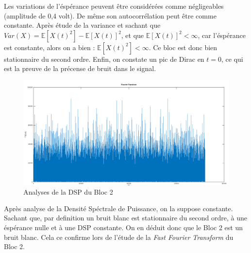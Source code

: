 \documentclass[french, a4paper, 12pt, openany]{book}
\begin{document}
	Les variations de l'éspérance peuvent être considérées comme négligeables (amplitude de 0,4 volt). De même son autocorrélation peut être comme constante.
	Après étude de la variance et sachant que \begin{math}Var(X) = \mathbb{E}[X(t)^2] - \mathbb{E}[X(t)]^2\end{math}, et que \begin{math}\mathbb{E}[X(t)]^2<\infty\end{math}, car l'éspérance est constante, alors on a bien : \begin{math}\mathbb{E}[X(t)^2]<\infty\end{math}. Ce bloc est donc bien stationnaire du second ordre.
	Enfin, on constate un pic de Dirac en \(t = 0\), ce qui est la preuve de la précense de bruit dans le signal.

	\begin{figure}[ht]
		\begin{center}
		\includegraphics[scale=0.25]{images/DSPBloc2.png}
		\end{center}
		\caption{Analyses de la DSP du Bloc 2}
		\label{Analyses de la DSP du Bloc 2}
	\end{figure}

	Après analyse de la Densité Spéctrale de Puissance, on la suppose constante. \\
	Sachant que, par definition un bruit blanc est stationnaire du second ordre, à une éspérance nulle et à une DSP constante. On en déduit donc que le Bloc 2 est un bruit blanc. Cela ce confirme lors de l'étude de la \textit{Fast Fourier Transform} du Bloc 2.
\end{document}
